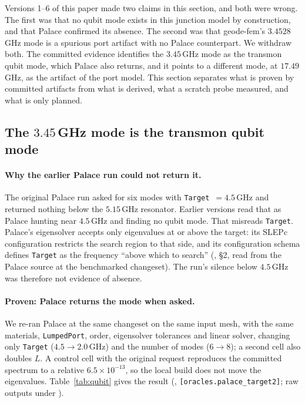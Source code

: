 \documentclass{anvil-paper}
\begin{document}
Versions 1--6 of this paper made two claims in this section, and both
were wrong. The first was that no qubit mode exists in this junction
model by construction, and that Palace confirmed its absence. The second
was that geode-fem's $3.4528$\,GHz mode is a spurious port artifact with
no Palace counterpart. We withdraw both. The committed evidence
identifies the $3.45$\,GHz mode as the transmon qubit mode, which Palace
also returns, and it points to a different mode, at $17.49$\,GHz, as the
artifact of the port model. This section separates what is proven by
committed artifacts from what is derived, what a scratch probe measured,
and what is only planned.

\subsection{The \texorpdfstring{$3.45$\,GHz}{3.45 GHz} mode is the transmon qubit mode}
\label{sec:qubit-mode}

\paragraph{Why the earlier Palace run could not return it.}
The original Palace run asked for six modes with
\texttt{Target}~$= 4.5$\,GHz and returned nothing below the $5.15$\,GHz
resonator. Earlier versions read that as Palace hunting near
$4.5$\,GHz and finding no qubit mode. That misreads \texttt{Target}.
Palace's eigensolver accepts only eigenvalues at or above the target: its
SLEPc configuration restricts the search region to that side, and its
configuration schema defines \texttt{Target} as the frequency ``above
which to search''
(, \S2, read
from the Palace source at the benchmarked changeset). The run's silence
below $4.5$\,GHz was therefore not evidence of absence.

\paragraph{Proven: Palace returns the mode when asked.}
We re-ran Palace at the same changeset on the same input mesh, with the
same materials, \texttt{LumpedPort}, order, eigensolver tolerances and
linear solver, changing only \texttt{Target} ($4.5 \to 2.0$\,GHz) and the
number of modes ($6 \to 8$); a second cell also doubles $L$. A control
cell with the original request reproduces the committed spectrum to a
relative $6.5\times10^{-13}$, so the local build does not move the
eigenvalues. Table~\ref{tab:qubit} gives the result
(,
\texttt{[oracles.palace\_target2]}; raw outputs under
).
\end{document}
